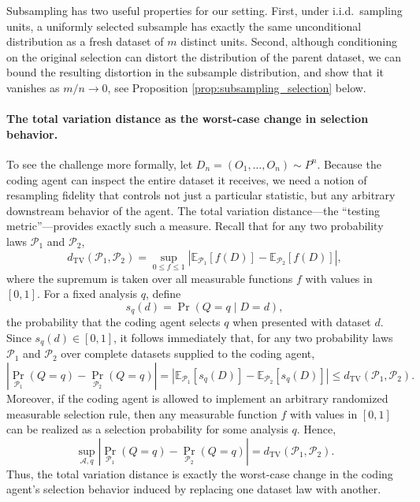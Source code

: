 \documentclass[10pt]{article}
\newcommand{\E}{\mathbb{E}}
\begin{document}
Subsampling has two useful properties for our setting. First, under i.i.d.\ sampling units, a uniformly selected subsample has exactly the same unconditional distribution as a fresh dataset of $m$ distinct units. Second, although conditioning on the original selection can distort the distribution of the parent dataset, we can bound the resulting distortion in the subsample distribution, and show that it vanishes as $m/n \to 0$, see Proposition \ref{prop:subsampling_selection} below.

\paragraph{The total variation distance as the worst-case change in selection behavior.}
To see the challenge more formally, let $D_n=(O_1,\ldots,O_n)\sim P^n$. Because the coding agent can inspect the entire dataset it receives, we need a notion of resampling fidelity that controls not just a particular statistic, but any arbitrary downstream behavior of the agent. The total variation distance---the ``testing metric''---provides exactly such a measure. Recall that for any two probability laws $\mathcal P_1$ and $\mathcal P_2$,
\[
d_{\mathrm{TV}}(\mathcal P_1,\mathcal P_2)
=
\sup_{0\leq f\leq 1}
\left|
\E_{\mathcal P_1}[f(D)]
-
\E_{\mathcal P_2}[f(D)]
\right|,
\]
where the supremum is taken over all measurable functions $f$ with values in $[0,1]$. For a fixed analysis $q$, define
\[
s_q(d)
=
\Pr(Q=q\mid D=d),
\]
the probability that the coding agent selects $q$ when presented with dataset $d$. Since $s_q(d)\in[0,1]$, it follows immediately that, for any two probability laws $\mathcal P_1$ and $\mathcal P_2$ over complete datasets supplied to the coding agent,
\[
\left|
\Pr_{\mathcal P_1}(Q=q)
-
\Pr_{\mathcal P_2}(Q=q)
\right|
=
\left|
\E_{\mathcal P_1}[s_q(D)]
-
\E_{\mathcal P_2}[s_q(D)]
\right|
\leq
d_{\mathrm{TV}}(\mathcal P_1,\mathcal P_2).
\]
Moreover, if the coding agent is allowed to implement an arbitrary randomized measurable selection rule, then any measurable function $f$ with values in $[0,1]$ can be realized as a selection probability for some analysis $q$. Hence,
\[
\sup_{\mathcal A,q}
\left|
\Pr_{\mathcal P_1}(Q=q)
-
\Pr_{\mathcal P_2}(Q=q)
\right|
=
d_{\mathrm{TV}}(\mathcal P_1,\mathcal P_2).
\]
Thus, the total variation distance is exactly the worst-case change in the coding agent's selection behavior induced by replacing one dataset law with another.
\end{document}
